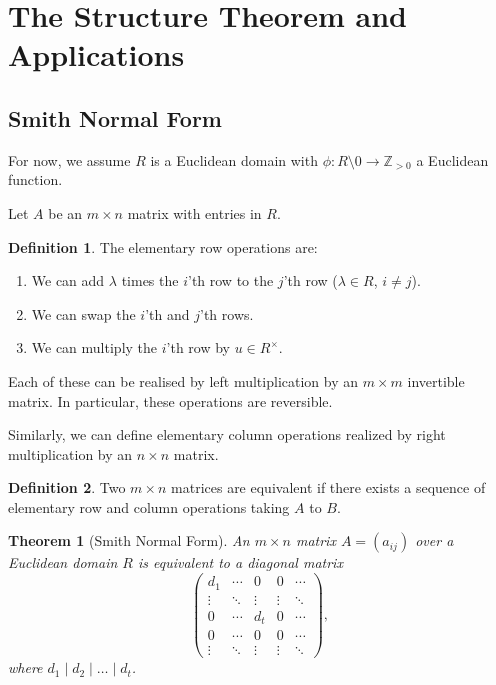 \documentclass[12pt]{article}
\newtheorem{theorem}{Theorem}[section]
\theoremstyle{definition}
\newtheorem{definition}{Definition}[section]
\theoremstyle{remark}
\begin{document}
\newpage

\section{The Structure Theorem and Applications}%
\label{sec:the_structure_theorem_and_applications}

\subsection{Smith Normal Form}%
\label{sub:smith_normal_form}

For now, we assume $R$ is a Euclidean domain with $\phi : R \setminus{0} \to \mathbb{Z}_{> 0}$ a Euclidean function.

Let $A$ be an $m \times n$ matrix with entries in $R$.

\begin{definition}
	The elementary row operations are:
	\begin{enumerate}[label = (ER\arabic*)]
		\item We can add $\lambda$ times the $i$'th row to the $j$'th row ($\lambda \in R$, $i \neq j$).
		\item We can swap the $i$'th and $j$'th rows.
		\item We can multiply the $i$'th row by $u \in R^{\times}$.
	\end{enumerate}
	Each of these can be realised by left multiplication by an $m \times m$ invertible matrix. In particular, these operations are reversible.

	Similarly, we can define elementary column operations realized by right multiplication by an $n \times n$ matrix.
\end{definition}

\begin{definition}
	Two $m \times n$ matrices are equivalent if there exists a sequence of elementary row and column operations taking $A$ to $B$.
\end{definition}

\begin{theorem}[Smith Normal Form]
	An $m \times n$ matrix $A = (a_{ij})$ over a Euclidean domain $R$ is equivalent to a diagonal matrix
	\[
	\begin{pmatrix}
		d_1 & \cdots & 0 & 0 & \cdots \\
		\vdots & \ddots & \vdots & \vdots & \ddots \\
		0 & \cdots & d_t & 0 & \cdots \\
		0 & \cdots & 0 & 0 & \cdots \\
		\vdots & \ddots & \vdots & \vdots & \ddots
	\end{pmatrix}
	,\]
	where $d_1 \mid d_2 \mid \ldots \mid d_t$.
\end{theorem}
\end{document}
